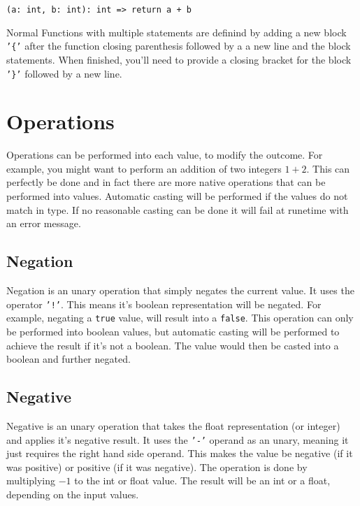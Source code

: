 \begin{center}
    \texttt{(a: int, b: int): int => return a + b}
\end{center}

Normal Functions with multiple statements are definind by adding a new block \texttt{'\{'} after the function
closing parenthesis followed by a a new line and the block statements. When finished, you'll need to provide
a closing bracket for the block \texttt{'\}'} followed by a new line.

\begin{center}
\end{center}

\section{Operations}

Operations can be performed into each value, to modify the outcome. For example, you might want to perform
an addition of two integers $1 + 2$. This can perfectly be done and in fact there are more native operations that
can be performed into values. Automatic casting will be performed if the values do not match in type. If no reasonable
casting can be done it will fail at runetime with an error message.

\subsection{Negation}

Negation is an unary operation that simply negates the current value. It uses the operator \texttt{'!'}.
This means it's boolean representation will be negated. For example, negating a \texttt{true} value,
will result into a \texttt{false}. This operation can only be performed into boolean values, but
automatic casting will be performed to achieve the result if it's not a boolean. The value would then be
casted into a boolean and further negated.

\subsection{Negative}

Negative is an unary operation that takes the float representation (or integer) and applies it's negative result.
It uses the \texttt{'-'} operand as an unary, meaning it just requires the right hand side operand.
This makes the value be negative (if it was positive) or positive (if it was negative).
The operation is done by multiplying $-1$ to the int or float value. The result will be an int or a float,
depending on the input values.

